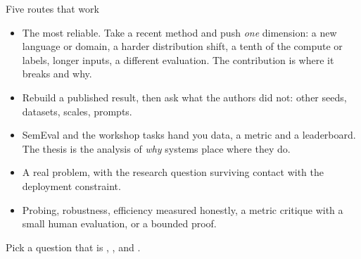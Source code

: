 \documentclass[aspectratio=169,11pt]{beamer}
\begin{document}
\begin{frame}{Five routes that work}
\footnotesize
\begin{itemize}
  \item {} The most reliable. Take a recent method and
        push \emph{one} dimension: a new language or domain, a harder
        distribution shift, a tenth of the compute or labels, longer inputs, a
        different evaluation. The contribution is where it breaks and why.
  \item {} Rebuild a published result, then
        ask what the authors did not: other seeds, datasets, scales, prompts.
  \item {} SemEval and the workshop tasks
        hand you data, a metric and a leaderboard. The thesis is the analysis
        of \emph{why} systems place where they do.
  \item {} A real problem, with the
        research question surviving contact with the deployment constraint.
  \item {} Probing, robustness, efficiency measured
        honestly, a metric critique with a small human evaluation, or a
        bounded proof.
\end{itemize}
\vspace{1mm}
\centering
Pick a question that is , , and
.
\end{frame}
\end{document}
